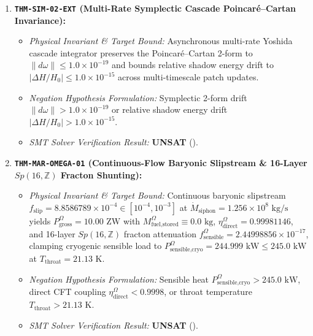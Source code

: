 \documentclass[11pt,onecolumn]{article}
\begin{document}
\begin{enumerate}
    \item \textbf{\texttt{THM-SIM-02-EXT} (Multi-Rate Symplectic Cascade Poincaré--Cartan Invariance):}
    \begin{itemize}
        \item \emph{Physical Invariant \& Target Bound:} Asynchronous multi-rate Yoshida cascade integrator preserves the Poincaré--Cartan 2-form to $\|d\omega\| \le 1.0 \times 10^{-19}$ and bounds relative shadow energy drift to $|\Delta H/H_0| \le 1.0 \times 10^{-15}$ across multi-timescale patch updates.
        \item \emph{Negation Hypothesis Formulation:} Symplectic 2-form drift $\|d\omega\| > 1.0 \times 10^{-19}$ or relative shadow energy drift $|\Delta H/H_0| > 1.0 \times 10^{-15}$.
        \item \emph{SMT Solver Verification Result:} \textbf{UNSAT} ().
    \end{itemize}

    \item \textbf{\texttt{THM-MAR-OMEGA-01} (Continuous-Flow Baryonic Slipstream \& 16-Layer $Sp(16,\mathbb{Z})$ Fracton Shunting):}
    \begin{itemize}
        \item \emph{Physical Invariant \& Target Bound:} Continuous baryonic slipstream $f_{\text{slip}} = 8.8586789 \times 10^{-4} \in [10^{-4}, 10^{-3}]$ at $\dot{M}_{\text{siphon}} = 1.256 \times 10^8\text{ kg/s}$ yields $P_{\text{gross}}^{\Omega} = 10.00\text{ ZW}$ with $M_{\text{fuel,stored}}^{\Omega} \equiv 0.0\text{ kg}$, $\eta_{\text{direct}}^{\Omega} = 0.99981146$, and 16-layer $Sp(16,\mathbb{Z})$ fracton attenuation $f_{\text{sensible}}^{\Omega} = 2.44998856 \times 10^{-17}$, clamping cryogenic sensible load to $P_{\text{sensible,cryo}}^{\Omega} = 244.999\text{ kW} \le 245.0\text{ kW}$ at $T_{\text{throat}} = 21.13\text{ K}$.
        \item \emph{Negation Hypothesis Formulation:} Sensible heat $P_{\text{sensible,cryo}}^{\Omega} > 245.0\text{ kW}$, direct CFT coupling $\eta_{\text{direct}}^{\Omega} < 0.9998$, or throat temperature $T_{\text{throat}} > 21.13\text{ K}$.
        \item \emph{SMT Solver Verification Result:} \textbf{UNSAT} ().
    \end{itemize}


\end{enumerate}
\end{document}
